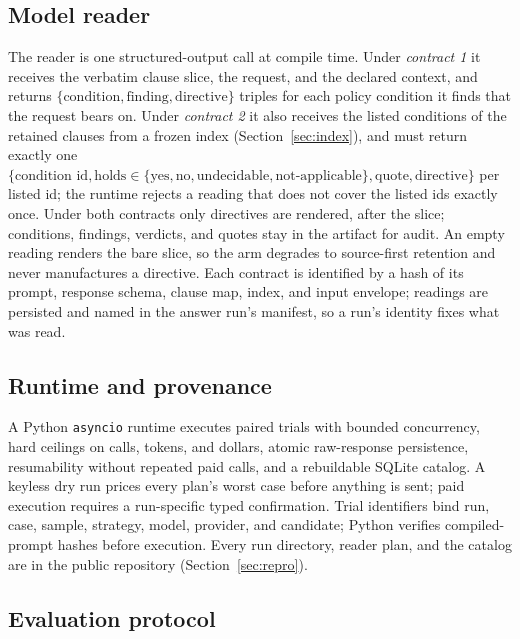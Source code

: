 \documentclass[11pt]{article}
\begin{document}
\subsection{Model reader}
\label{sec:reader}

The reader is one structured-output call at compile time. Under \emph{contract 1} it receives the verbatim clause slice, the request, and the declared context, and returns $\{\text{condition}, \text{finding}, \text{directive}\}$ triples for each policy condition it finds that the request bears on. Under \emph{contract 2} it also receives the listed conditions of the retained clauses from a frozen index (Section~\ref{sec:index}), and must return exactly one $\{\text{condition id}, \text{holds} \in \{\text{yes}, \text{no}, \text{undecidable}, \text{not-applicable}\}, \text{quote}, \text{directive}\}$ per listed id; the runtime rejects a reading that does not cover the listed ids exactly once. Under both contracts only directives are rendered, after the slice; conditions, findings, verdicts, and quotes stay in the artifact for audit. An empty reading renders the bare slice, so the arm degrades to source-first retention and never manufactures a directive. Each contract is identified by a hash of its prompt, response schema, clause map, index, and input envelope; readings are persisted and named in the answer run's manifest, so a run's identity fixes what was read.

\subsection{Runtime and provenance}

A Python \texttt{asyncio} runtime executes paired trials with bounded concurrency, hard ceilings on calls, tokens, and dollars, atomic raw-response persistence, resumability without repeated paid calls, and a rebuildable SQLite catalog. A keyless dry run prices every plan's worst case before anything is sent; paid execution requires a run-specific typed confirmation. Trial identifiers bind run, case, sample, strategy, model, provider, and candidate; Python verifies compiled-prompt hashes before execution. Every run directory, reader plan, and the catalog are in the public repository (Section~\ref{sec:repro}).

\subsection{Evaluation protocol}
\label{sec:protocol}
\end{document}
